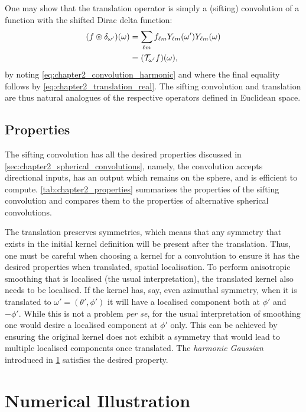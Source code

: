 One may show that the translation operator is simply a (sifting) convolution of a function with the shifted Dirac delta function:
%
\begin{align}
	\pixel{\convolution{f}{\delta_{\omega'}}}
	 & = \harmonicSum \harmonic{f} \pixel[']{\harmonic{Y}} \pixel{\harmonic{Y}} \nonumber{} \\
	 & = \pixel{(\translation{\omega'}f)},
\end{align}
%
by noting \cref{eq:chapter2_convolution_harmonic} and where the final equality follows by \cref{eq:chapter2_translation_real}.
The sifting convolution and translation are thus natural analogues of the respective operators defined in Euclidean space.

\subsection{Properties}

The sifting convolution has all the desired properties discussed in \cref{sec:chapter2_spherical_convolutions}, namely, the convolution accepts directional inputs, has an output which remains on the sphere, and is efficient to compute.
\cref{tab:chapter2_properties} summarises the properties of the sifting convolution and compares them to the properties of alternative spherical convolutions.

The translation preserves symmetries, which means that any symmetry that exists in the initial kernel definition will be present after the translation.
Thus, one must be careful when choosing a kernel for a convolution to ensure it has the desired properties when translated, \eg{} spatial localisation.
To perform anisotropic smoothing that is localised (the usual interpretation), the translated kernel also needs to be localised.
If the kernel has, say, even azimuthal symmetry, when it is translated to \(\omega'=(\theta', \phi')\) it will have a localised component both at \(\phi'\) and \(-\phi'\).
While this is not a problem \emph{per se}, for the usual interpretation of smoothing one would desire a localised component at \(\phi'\) only.
This can be achieved by ensuring the original kernel does not exhibit a symmetry that would lead to multiple localised components once translated.
The \emph{harmonic Gaussian} introduced in \cref{sec:chapter2_numerical_illustration} satisfies the desired property.

\section{Numerical Illustration}\label{sec:chapter2_numerical_illustration}


